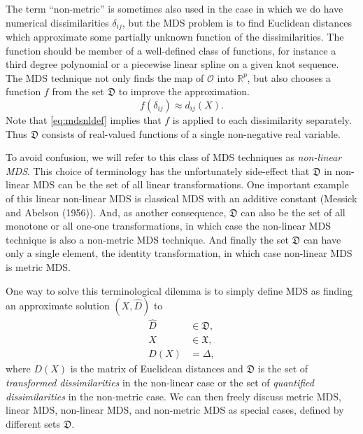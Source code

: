 \documentclass[
  12pt,
]{article}
\begin{document}
The term ``non-metric'' is sometimes also used in the case in which we do have numerical dissimilarities \(\delta_{ij}\), but the MDS problem is to find Euclidean distances which approximate some partially unknown function of the dissimilarities. The function should be member of a well-defined class of functions, for
instance a third degree polynomial or a piecewise linear spline on a
given knot sequence. The MDS technique not only finds the map of
\(\mathcal{O}\) into \(\mathbb{R}^p\), but also chooses a function \(f\)
from the set \(\mathfrak{D}\) to improve the approximation.
\begin{equation}
f(\delta_{ij})\approx d_{ij}(X).
\label{eq:mdsnldef}
\end{equation}
Note that \eqref{eq:mdsnldef} implies that \(f\) is applied to each
dissimilarity separately. Thus \(\mathfrak{D}\) consists of real-valued
functions of a single non-negative real variable.

To avoid confusion, we will refer to this class
of MDS techniques as \emph{non-linear MDS}. This choice of terminology
has the unfortunately side-effect that \(\mathfrak{D}\) in non-linear
MDS can be the set of all linear transformations. One important
example of this linear non-linear MDS is classical MDS with an
additive constant (Messick and Abelson (1956)). And, as another consequence, \(\mathfrak{D}\) can also be the set of all monotone or all one-one transformations, in which case the non-linear MDS technique is also a non-metric MDS technique. And finally the set \(\mathfrak{D}\) can have
only a single element, the identity transformation, in which case
non-linear MDS is metric MDS.

One way to solve this terminological dilemma is to simply define
MDS as finding an approximate solution \((X,\hat D)\) to
\begin{subequations}
\begin{align}
\hat D&\in\mathfrak{D}\label{eq:gmdsdef1},\\
X&\in\mathfrak{X}\label{eq:gmdsdef2},\\
D(X)&=\Delta\label{eq:gmdsdef3},
\end{align}
\end{subequations}
where \(D(X)\) is the matrix of Euclidean distances and \(\mathfrak{D}\) is the set of \emph{transformed dissimilarities} in the non-linear case or the set of \emph{quantified dissimilarities} in the non-metric case. We can then freely discuss
metric MDS, linear MDS, non-linear MDS, and non-metric MDS as special cases,
defined by different sets \(\mathfrak{D}\).
\end{document}
